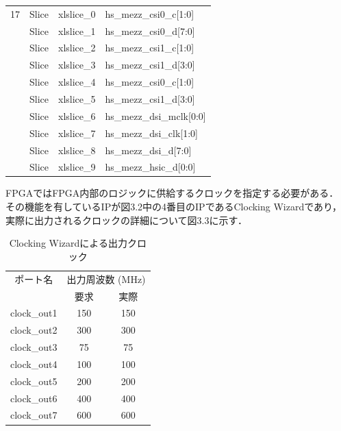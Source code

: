 \documentclass[11pt,a4j]{jreport}
\begin{document}
\begin{table}[H]
\begin{tabular}{clll}
    17 & Slice & xlslice_0 & hs_mezz_csi0_c[1:0] \\
    & Slice & xlslice_1 & hs_mezz_csi0_d[7:0] \\
    & Slice & xlslice_2 & hs_mezz_csi1_c[1:0] \\
    & Slice & xlslice_3 & hs_mezz_csi1_d[3:0] \\
    & Slice & xlslice_4 & hs_mezz_csi0_c[1:0] \\
    & Slice & xlslice_5 & hs_mezz_csi1_d[3:0] \\
    & Slice & xlslice_6 & hs_mezz_dsi_mclk[0:0] \\
    & Slice & xlslice_7 & hs_mezz_dsi_clk[1:0] \\
    & Slice & xlslice_8 & hs_mezz_dsi_d[7:0] \\
    & Slice & xlslice_9 & hs_mezz_hsic_d[0:0] \\
  \hline
  \end{tabular}
\end{table}
FPGAではFPGA内部のロジックに供給するクロックを指定する必要がある．
その機能を有しているIPが図3.2中の4番目のIPであるClocking Wizardであり，
実際に出力されるクロックの詳細について図3.3に示す．
\begin{table}[hbtp]
  \caption{Clocking Wizardによる出力クロック}
  \label{physics}
  \centering
  \begin{tabular}{ccc}
    \hline
    ポート名 & \multicolumn{2}{c}{出力周波数 (MHz)} \\
    \cmidrule(lr){2-3}
     & 要求 & 実際 \\
    \hline
    clock_out1 & 150 & 150 \\
    clock_out2 & 300 & 300 \\
    clock_out3 & 75 & 75 \\
    clock_out4 & 100 & 100 \\
    clock_out5 & 200 & 200 \\
    clock_out6 & 400 & 400 \\
    clock_out7 & 600 & 600 \\
    \hline
    \end{tabular}
\end{table}
\end{document}

